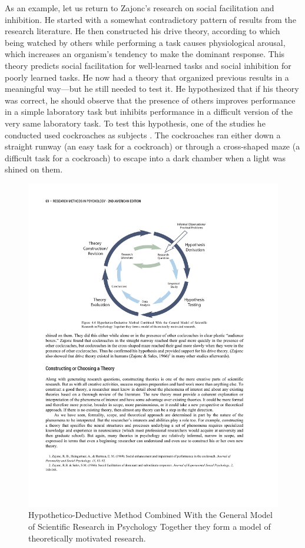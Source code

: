 As an example, let us return to Zajonc's research on social facilitation and inhibition. He started with a somewhat contradictory pattern of results from the research literature. He then constructed his drive theory, according to which being watched by others while performing a task causes physiological arousal, which increases an organism's tendency to make the dominant response. This theory predicts social facilitation for well-learned tasks and social inhibition for poorly learned tasks. He now had a theory that organized previous results in a meaningful way---but he still needed to test it. He hypothesized that if his theory was correct, he should observe that the presence of others improves performance in a simple laboratory task but inhibits performance in a difficult version of the very same laboratory task. To test this hypothesis, one of the studies he conducted used cockroaches as subjects \citep{zajonc_social_1969}. The cockroaches ran either down a straight runway (an easy task for a cockroach) or through a cross-shaped maze (a difficult task for a cockroach) to escape into a dark chamber when a light was shined on them. 


\begin{figure}
      \includegraphics[width=\linewidth]{figures/C4Theory.pdf}
      \caption{Hypothetico-Deductive Method Combined With the General Model of Scientific Research in Psychology Together they form a model of theoretically motivated research.
}
      \label{fig:Theory}
\end{figure}

